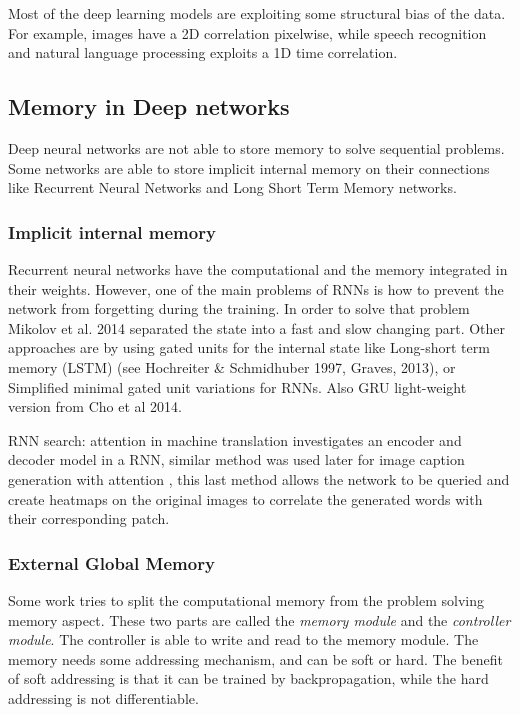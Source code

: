 \documentclass[b5paper]{report}
\begin{document}
Most of the deep learning models are exploiting some structural bias of the
data. For example, images have a 2D correlation pixelwise, while speech
recognition and natural language processing exploits a 1D time correlation.

\subsection{Memory in Deep networks}

Deep neural networks are not able to store memory to solve sequential problems.
Some networks are able to store implicit internal memory on their connections
like Recurrent Neural Networks and Long Short Term Memory networks.

\subsubsection{Implicit internal memory}

Recurrent neural networks have the computational and the memory integrated in
their weights. However, one of the main problems of RNNs is how to prevent the
network from forgetting during the training. In order to solve that problem
Mikolov et al. 2014 separated the state into a fast and slow changing part.
Other approaches are by using gated units for the internal state like
Long-short term memory (LSTM) (see Hochreiter \& Schmidhuber 1997, Graves,
2013), or Simplified minimal gated unit variations for RNNs. Also GRU
light-weight version from Cho et al 2014.

RNN search: attention in machine translation \cite{bahdanau2014neural}
investigates an encoder and decoder model in a RNN, similar method was used
later for image caption generation with attention \cite{xu2015show}, this last
method allows the network to be queried and create heatmaps on the original
images to correlate the generated words with their corresponding patch.

\subsubsection{External Global Memory}

Some work tries to split the computational memory from the problem solving
memory aspect. These two parts are called the \emph{memory module} and the
\emph{controller module}. The controller is able to write and read to the
memory module. The memory needs some addressing mechanism, and can be soft or
hard. The benefit of soft addressing is that it can be trained by
backpropagation, while the hard addressing is not differentiable.
\end{document}
